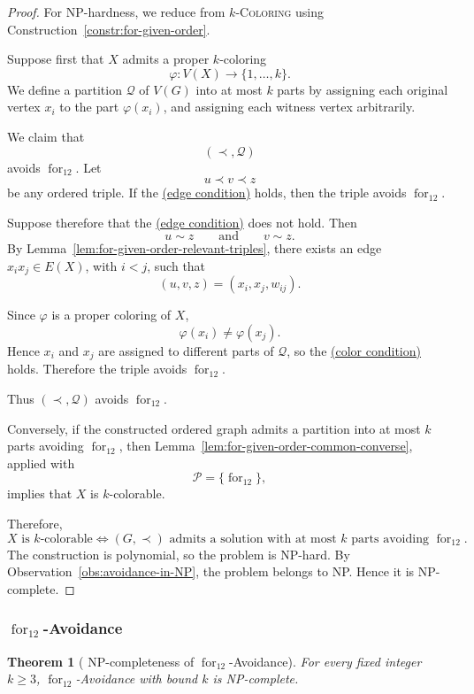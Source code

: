 \documentclass[12pt]{article}
\theoremstyle{plain}
\newtheorem{theorem}{Theorem}[section]
\theoremstyle{definition}
\theoremstyle{remark}
\theoremstyle{definition}
\newcommand{\edgecondition}{%
  \hyperref[def:avoid:cond:edge]{(edge condition)}\xspace
}
\newcommand{\colorcondition}{%
  \hyperref[def:avoid:cond:color]{(color condition)}\xspace
}
\newcommand{\forlabel}{\mathrm{for}}
\DeclareRobustCommand{\forparam}[1]{%
  \ensuremath{\mathop{\forlabel}\nolimits_{#1}}%
}
\begin{document}
\begin{proof}
For NP-hardness, we reduce from
\(k\)-\textsc{Coloring} using
Construction~\ref{constr:for-given-order}.

Suppose first that \(X\) admits a proper \(k\)-coloring
\[
\varphi:V(X)\to\{1,\dots,k\}.
\]
We define a partition \(\mathcal Q\) of \(V(G)\) into at most \(k\)
parts by assigning each original vertex \(x_i\) to the part
\(\varphi(x_i)\), and assigning each witness vertex arbitrarily.

We claim that
\[
(\prec,\mathcal Q)
\]
avoids \(\forparam{12}\). Let
\[
u\prec v\prec z
\]
be any ordered triple. If the \edgecondition{} holds, then the triple
avoids \(\forparam{12}\).

Suppose therefore that the \edgecondition{} does not hold. Then
\[
u\sim z
\qquad\text{and}\qquad
v\sim z.
\]
By Lemma~\ref{lem:for-given-order-relevant-triples}, there exists an
edge \(x_ix_j\in E(X)\), with \(i<j\), such that
\[
(u,v,z)=(x_i,x_j,w_{ij}).
\]

Since \(\varphi\) is a proper coloring of \(X\),
\[
\varphi(x_i)\neq\varphi(x_j).
\]
Hence \(x_i\) and \(x_j\) are assigned to different parts of
\(\mathcal Q\), so the \colorcondition{} holds. Therefore the triple
avoids \(\forparam{12}\).

Thus \((\prec,\mathcal Q)\) avoids \(\forparam{12}\).

Conversely, if the constructed ordered graph admits a partition into
at most \(k\) parts avoiding \(\forparam{12}\), then
Lemma~\ref{lem:for-given-order-common-converse}, applied with
\[
\mathcal P=\{\forparam{12}\},
\]
implies that \(X\) is \(k\)-colorable.

Therefore,
\[
X\text{ is \(k\)-colorable}
\iff
(G,\prec)\text{ admits a solution with at most \(k\) parts avoiding }
\forparam{12}.
\]
The construction is polynomial, so the problem is NP-hard.
By Observation~\ref{obs:avoidance-in-NP}, the problem belongs to NP.
Hence it is NP-complete.
\end{proof}





\subsubsection{
\texorpdfstring{\(\forparam{12}\)-Avoidance}
{for12-Avoidance}
}
\label{subsubsec:for12-avoidance}






\begin{theorem}[
NP-completeness of
\texorpdfstring{\(\forparam{12}\)-Avoidance}
{for12-Avoidance}
]
\label{thm:for12-np-complete}
For every fixed integer \(k\ge 3\),
\(\forparam{12}\)-Avoidance with bound \(k\) is NP-complete.
\end{theorem}
\end{document}
